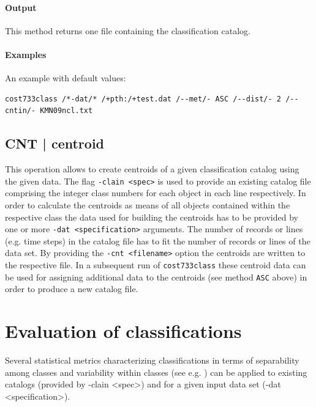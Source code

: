 \documentclass[12pt, oneside, a4paper, headsepline, plainheadsepline]{scrbook}
\begin{document}
\subsubsection*{Output}
This method returns one file containing the classification catalog. 

\subsubsection*{Examples}
An example with default values:
\begin{lstlisting}
cost733class /*-dat/* /+pth:/+test.dat /--met/- ASC /--dist/- 2 /--cntin/- KMN09ncl.txt
\end{lstlisting}

\section{CNT | centroid}
This operation allows to create centroids of a given classification catalog using the given data. 
The flag \verb+-clain <spec>+ is  used to provide an existing catalog file comprising the integer class numbers
for each object in each line respectively. In order to calculate the centroids as means of
all objects contained within the respective class the data used for building the centroids has to be 
provided by one or more \verb+-dat <specification>+ arguments. The number of records or lines (e.g. time steps)
in the catalog file has to fit the number of records or lines of the data set.
By providing the \verb+-cnt <filename>+ option the centroids are written to the respective file. 
In a subsequent run of \verb+cost733class+ these centroid data can be used for assigning additional data
to the centroids (see method \verb+ASC+ above) in order to produce a new catalog file.


\chapter{Evaluation of classifications}
\label{evaluation}
Several statistical metrics characterizing classifications in terms of separability among classes and variability within classes (see e.g.  \citet{Beck2010}) can be applied to existing catalogs (provided by -clain <spec>) and for a given input data set (-dat <specification>).


\end{document}
